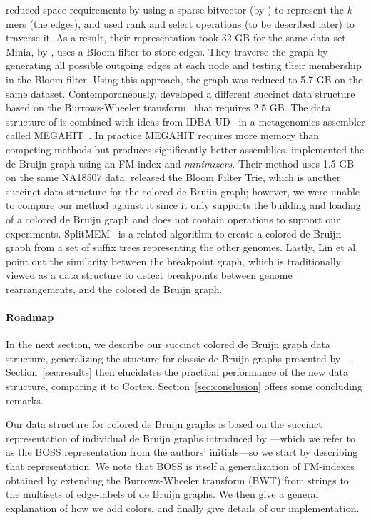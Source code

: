 \documentclass[doctor]{thesis}
\begin{document}
 \cite{conway} reduced space requirements by using a sparse bitvector  (by \cite{bitvector}) to represent the $k$-mers (the edges), and used rank and select operations (to be described later) to traverse it. As a result, their representation took 32 GB for the same data set.  Minia, by \cite{wabi}, uses a Bloom filter to store edges. They traverse the graph by generating all possible outgoing edges at each node and testing their membership in the Bloom filter. Using this approach, the graph was reduced to 5.7 GB on the same dataset.  Contemporaneously, \cite{BOSS12} developed a different succinct data structure based on the Burrows-Wheeler transform~\citep{BW94} that requires 2.5 GB.  The data structure of \cite{BOSS12} is combined with ideas from IDBA-UD~\citep{idbaud} in a metagenomics assembler called MEGAHIT~\citep{megahit}.  In practice MEGAHIT requires more memory than competing methods  but produces significantly better assemblies.   \cite{paul} implemented the de Bruijn graph using an FM-index and {\em minimizers}.   Their method uses 1.5 GB on the same NA18507 data.  \cite{BFT} released the Bloom Filter Trie, which is another succinct data structure for the colored de Bruiin graph; however, we were unable to compare our method against it since  it only supports the building and loading of a colored de Bruijn graph and does not contain operations to support our experiments.  SplitMEM~\citep{splitmem} is a related algorithm to create a colored de Bruijn graph from a set of suffix trees representing the other genomes. Lastly, Lin et al. \citep{Lin} point out the similarity between the breakpoint graph, which is traditionally viewed as a data structure to detect breakpoints between genome rearrangements, and the colored de Bruijn graph. 
 

\paragraph{Roadmap} In the next section, we describe our succinct colored de Bruijn graph data structure, generalizing the stucture for classic de Bruijn graphs presented by ~\cite{BOSS12}. Section~\ref{sec:results} then elucidates the practical performance of the new data structure, comparing it to {\sc Cortex}. Section~\ref{sec:conclusion} offers some concluding remarks.

 
\makeatletter{}\label{sec:methods}

Our data structure for colored de Bruijn graphs is based on the succinct representation of individual de Bruijn graphs introduced by \cite{BOSS12}---which we refer to as the BOSS representation from the authors' initials---so we start by describing that representation.  We note that BOSS is itself a generalization of FM-indexes~\citep{FM05} obtained by extending the Burrows-Wheeler transform (BWT) from strings to the multisets of edge-labels of de Bruijn graphs.  We then give a general explanation of how we add colors, and finally give details of our implementation.
\end{document}
